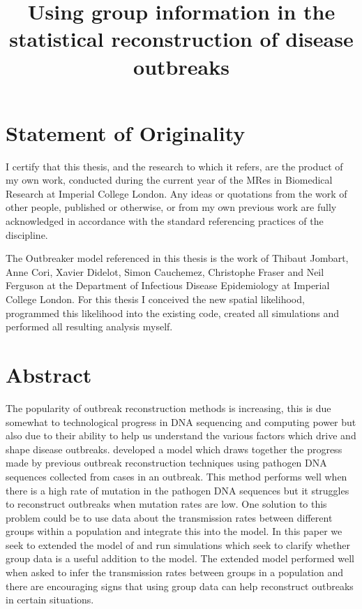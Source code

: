 \documentclass[11pt,a4paper]{report}
\title{Using group information in the statistical reconstruction of disease outbreaks}
\begin{document}
\maketitle




\chapter*{Statement of Originality}
\thispagestyle{empty}
\noindent I certify that this thesis, and the research to which it refers, are the product of my own work, conducted during the current year of the MRes in Biomedical Research at Imperial College London. Any ideas or quotations from the work of other people, published or otherwise, or from my own previous work are fully acknowledged in accordance with the standard referencing practices of the discipline. 


The Outbreaker model referenced in this thesis is the work of Thibaut Jombart, Anne Cori, Xavier Didelot, Simon Cauchemez, Christophe Fraser and Neil Ferguson at the Department of Infectious Disease Epidemiology at Imperial College London. For this thesis I conceived the new spatial likelihood, programmed this likelihood into the existing code, created all simulations and performed all resulting analysis myself.
\newpage

\chapter*{Abstract}
\thispagestyle{empty}
The popularity of outbreak reconstruction methods is increasing, this is due somewhat to technological progress in DNA sequencing and computing power but also due to their ability to help us understand the various factors which drive and shape disease outbreaks. \citet{outbrkr} developed a model which draws together the progress made by previous outbreak reconstruction techniques using pathogen DNA sequences collected from cases in an outbreak. This method performs well when there is a high rate of mutation in the pathogen DNA sequences but it struggles to reconstruct outbreaks when mutation rates are low. One solution to this problem could be to use data about the transmission rates between different groups within a population and integrate this into the model. In this paper we seek to extended the model of \citet{outbrkr} and run simulations which seek to clarify whether group data is a useful addition to the model. The extended model performed well when asked to infer the transmission rates between groups in a population and there are encouraging signs that using group data can help reconstruct outbreaks in certain situations.
\end{document}

